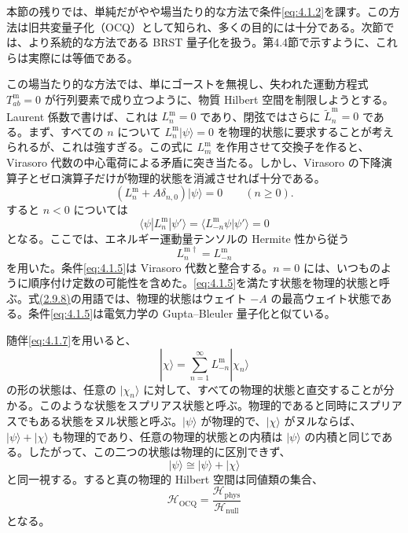 本節の残りでは、単純だがやや場当たり的な方法で条件\eqref{eq:4.1.2}を課す。この方法は旧共変量子化（OCQ）として知られ、多くの目的には十分である。次節では、より系統的な方法である BRST 量子化を扱う。第4.4節で示すように、これらは実際には等価である。

この場当たり的な方法では、単にゴーストを無視し、失われた運動方程式 $T^{\mathrm m}_{ab}=0$ が行列要素で成り立つように、物質 Hilbert 空間を制限しようとする。Laurent 係数で書けば、これは $L^{\mathrm m}_n=0$ であり、閉弦ではさらに $\widetilde L^{\mathrm m}_n=0$ である。まず、すべての $n$ について $L^{\mathrm m}_n|\psi\rangle=0$ を物理的状態に要求することが考えられるが、これは強すぎる。この式に $L^{\mathrm m}_m$ を作用させて交換子を作ると、Virasoro 代数の中心電荷による矛盾に突き当たる。しかし、Virasoro の下降演算子とゼロ演算子だけが物理的状態を消滅させれば十分である。
\begin{equation}
(L^{\mathrm m}_n+A\delta_{n,0})|\psi\rangle=0
\qquad(n\geq0).
\tag{4.1.5}\label{eq:4.1.5}
\end{equation}
すると $n<0$ については
\begin{equation}
\langle\psi|L^{\mathrm m}_n|\psi'\rangle
=\langle L^{\mathrm m}_{-n}\psi|\psi'\rangle=0
\tag{4.1.6}\label{eq:4.1.6}
\end{equation}
となる。ここでは、エネルギー運動量テンソルの Hermite 性から従う
\begin{equation}
L^{\mathrm m\dagger}_n=L^{\mathrm m}_{-n}
\tag{4.1.7}\label{eq:4.1.7}
\end{equation}
を用いた。条件\eqref{eq:4.1.5}は Virasoro 代数と整合する。$n=0$ には、いつものように順序付け定数の可能性を含めた。\eqref{eq:4.1.5}を満たす状態を物理的状態と呼ぶ。式\hyperref[eq:2.9.8a]{(2.9.8)}の用語では、物理的状態はウェイト $-A$ の最高ウェイト状態である。条件\eqref{eq:4.1.5}は電気力学の Gupta--Bleuler 量子化と似ている。

随伴\eqref{eq:4.1.7}を用いると、
\begin{equation}
|\chi\rangle=\sum_{n=1}^{\infty}L^{\mathrm m}_{-n}|\chi_n\rangle
\tag{4.1.8}\label{eq:4.1.8}
\end{equation}
の形の状態は、任意の $|\chi_n\rangle$ に対して、すべての物理的状態と直交することが分かる。このような状態をスプリアス状態と呼ぶ。物理的であると同時にスプリアスでもある状態をヌル状態と呼ぶ。$|\psi\rangle$ が物理的で、$|\chi\rangle$ がヌルならば、$|\psi\rangle+|\chi\rangle$ も物理的であり、任意の物理的状態との内積は $|\psi\rangle$ の内積と同じである。したがって、この二つの状態は物理的に区別できず、
\begin{equation}
|\psi\rangle\cong|\psi\rangle+|\chi\rangle
\tag{4.1.9}\label{eq:4.1.9}
\end{equation}
と同一視する。すると真の物理的 Hilbert 空間は同値類の集合、
\begin{equation}
\mathcal H_{\mathrm{OCQ}}=
\frac{\mathcal H_{\mathrm{phys}}}{\mathcal H_{\mathrm{null}}}
\tag{4.1.10}\label{eq:4.1.10}
\end{equation}
となる。

